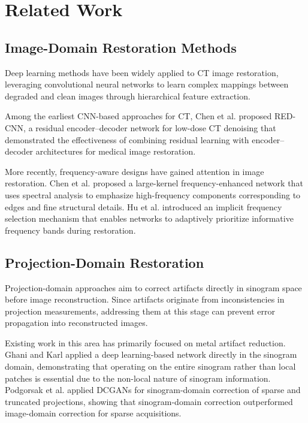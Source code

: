 \chapter{Related Work}
\label{chap:relatedwork}
\section{Image-Domain Restoration Methods}

Deep learning methods have been widely applied to CT image restoration, leveraging convolutional neural networks to learn complex mappings between degraded and clean images through hierarchical feature extraction.

Among the earliest CNN-based approaches for CT, Chen et al. \cite{Che+17a} proposed RED-CNN, a residual encoder–decoder network for low-dose CT denoising that demonstrated the effectiveness of combining residual learning with encoder–decoder architectures for medical image restoration. 

More recently, frequency-aware designs have gained attention in image restoration. Chen et al. \cite{LKFN2024} proposed a large-kernel frequency-enhanced network that uses spectral analysis to emphasize high-frequency components corresponding to edges and fine structural details. Hu et al. \cite{hu2025ifsr} introduced an implicit frequency selection mechanism that enables networks to adaptively prioritize informative frequency bands during restoration. 

\section{Projection-Domain Restoration} 
Projection-domain approaches aim to correct artifacts directly in sinogram space before image reconstruction. Since artifacts originate from inconsistencies in projection measurements, addressing them at this stage can prevent error propagation into reconstructed images.

Existing work in this area has primarily focused on metal artifact reduction. Ghani and Karl \cite{Gha2018} applied a deep learning-based network directly in the sinogram domain, demonstrating that operating on the entire sinogram rather than local patches is essential due to the non-local nature of sinogram information. Podgorsak et al. \cite{Pod2021} applied DCGANs for sinogram-domain correction of sparse and truncated projections, showing that sinogram-domain correction outperformed image-domain correction for sparse acquisitions.




